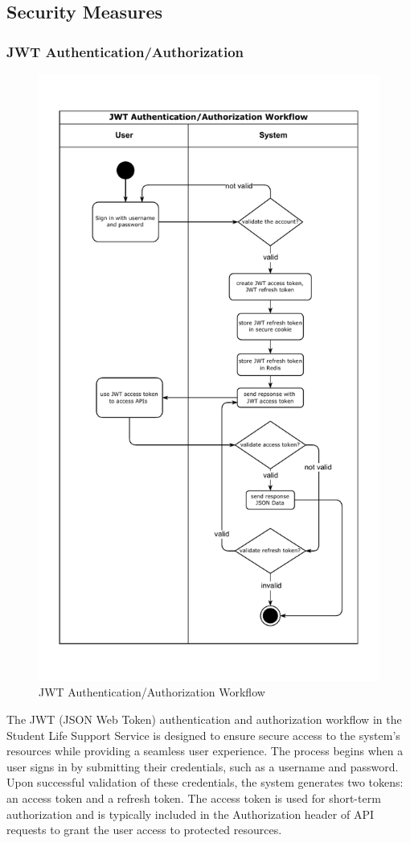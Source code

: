 \newpage
\subsection{Security Measures}
	\subsubsection{JWT Authentication/Authorization}
	\begin{figure}[H]
		\centering
		\includegraphics[width=0.58\columnwidth]{graphics/jwt-auth.pdf}
		\caption{JWT Authentication/Authorization Workflow}
		\label{fig:jwt-auth}
	\end{figure}
	
	The JWT (JSON Web Token) authentication and authorization workflow in the Student Life Support Service is designed to ensure secure access to the system's resources while providing a seamless user experience. The process begins when a user signs in by submitting their credentials, such as a username and password. Upon successful validation of these credentials, the system generates two tokens: an access token and a refresh token. The access token is used for short-term authorization and is typically included in the Authorization header of API requests to grant the user access to protected resources. 
	
